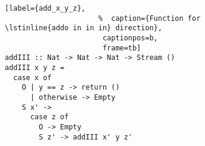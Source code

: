 \begin{figure}[!t]
  \centering
  \begin{minipage}{\columnwidth}
    \begin{lstlisting}[label={add_x_y_z},
                      %  caption={Function for \lstinline{addo in in in} direction},
                       captionpos=b,
                       frame=tb]
addIII :: Nat -> Nat -> Nat -> Stream ()
addIII x y z =
  case x of
    O | y == z -> return ()
      | otherwise -> Empty
    S x' ->
      case z of
        O -> Empty
        S z' -> addIII x' y z'
    \end{lstlisting}
  \end{minipage}
\end{figure}